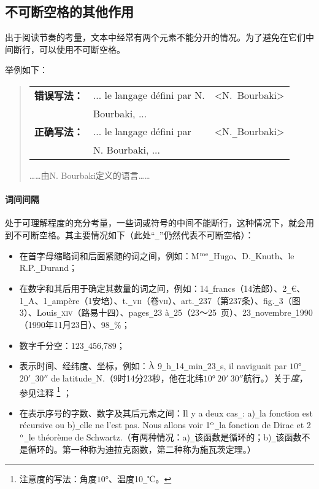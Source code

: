\subsection{不可断空格的其他作用}

出于阅读节奏的考量，文本中经常有两个元素不能分开的情况。为了避免在它们中间断行，可以使用不可断空格。

举例如下：

\begin{quote}
    \begin{tabular}{lll}
        \textbf{错误写法：} & ... le langage défini par N. & <N.\verb*+ +Bourbaki> \\
        & Bourbaki, ... & \\
        \textbf{正确写法：} & ... le langage défini par & <N.\verb|_|Bourbaki>\\
        & N. Bourbaki, ... & \\
    \end{tabular}

    \begin{bil}
        ……由N. Bourbaki定义的语言……
    \end{bil}
\end{quote}

\paragraph*{词间间隔} 处于可理解程度的充分考量，一些词或符号的中间不能断行，这种情况下，就会用到不可断空格。其主要情况如下（此处``\verb|_|''仍然代表不可断空格）：

\begin{itemize}
    \item 在首字母缩略词和后面紧随的词之间，例如：M$^{\rm me}$\verb|_|Hugo、D.\verb|_|Knuth、le R.P.\verb|_|Durand；
    \item 在数字和其后用于确定其数量的词之间，例如：14\verb|_|francs（14法郎）、2\verb|_|€、1\verb|_|A、1\verb|_|ampère（1安培）、t.\verb|_|\textsc{vii}（卷\textsc{vii}）、art.\verb|_|237（第237条）、fig.\verb|_|3（图3）、Louis\verb|_|\textsc{xiv}（路易十四）、pages\verb|_|23 à\verb|_|25（23～25~页）、23\verb|_|novembre\verb|_|1990（1990年11月23日）、98\verb|_|\%；
    \item 数字千分空：123\verb|_|456,789；
    \item 表示时间、经纬度、坐标，例如：À 9\verb|_|h\verb|_|14\verb|_|min\verb|_|23\verb|_|s, il naviguait par $10°$\verb|_|$20'$\verb|_|$30''$ de latitude\verb|_|N.（9时14分23秒，他在北纬$10°\ 20'\ 30''$航行。）关于\emph{度}，参见注释
        \footnote{注意度的写法：角度$10°$、温度10\texttt{\_}℃。}
    ；
    \item 在表示序号的字数、数字及其后元素之间：Il y a deux cas\verb|_|: a)\verb|_|la fonction est récursive ou b)\verb|_|elle ne l'est pas. Nous allons voir 1$^{\rm o}$\verb|_|la fonction de Dirac et 2$^{\rm o}$\verb|_|le théorème de Schwartz.（有两种情况：a)\verb|_|该函数是循环的；b)\verb|_|该函数不是循环的。第一种称为迪拉克函数，第二种称为施瓦茨定理。）
\end{itemize}

